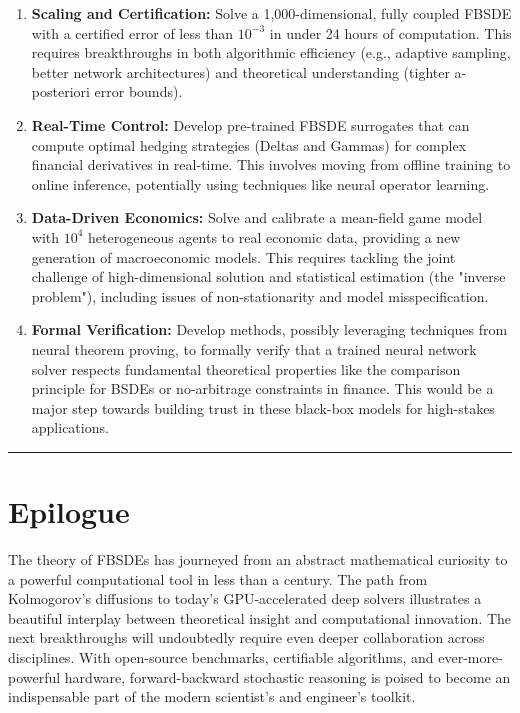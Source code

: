 \documentclass[11pt,letterpaper,oneside]{article}
\theoremstyle{plain}
\theoremstyle{definition}
\theoremstyle{remark}
\begin{document}
\begin{enumerate}[label=\textbf{C\arabic*}. ,leftmargin=1.6em]
  \item \textbf{Scaling and Certification:} Solve a 1,000-dimensional, fully coupled FBSDE with a certified error of less than \(10^{-3}\) in under 24 hours of computation. This requires breakthroughs in both algorithmic efficiency (e.g., adaptive sampling, better network architectures) and theoretical understanding (tighter a-posteriori error bounds).
  \item \textbf{Real-Time Control:} Develop pre-trained FBSDE surrogates that can compute optimal hedging strategies (Deltas and Gammas) for complex financial derivatives in real-time. This involves moving from offline training to online inference, potentially using techniques like neural operator learning.
  \item \textbf{Data-Driven Economics:} Solve and calibrate a mean-field game model with \(10^4\) heterogeneous agents to real economic data, providing a new generation of macroeconomic models. This requires tackling the joint challenge of high-dimensional solution and statistical estimation (the "inverse problem"), including issues of non-stationarity and model misspecification.
  \item \textbf{Formal Verification:} Develop methods, possibly leveraging techniques from neural theorem proving, to formally verify that a trained neural network solver respects fundamental theoretical properties like the comparison principle for BSDEs or no-arbitrage constraints in finance. This would be a major step towards building trust in these black-box models for high-stakes applications.
\end{enumerate}

\bigskip\hrule\bigskip

\section*{Epilogue}

The theory of FBSDEs has journeyed from an abstract mathematical curiosity to a powerful computational tool in less than a century. The path from Kolmogorov’s diffusions to today’s GPU-accelerated deep solvers illustrates a beautiful interplay between theoretical insight and computational innovation. The next breakthroughs will undoubtedly require even deeper collaboration across disciplines. With open-source benchmarks, certifiable algorithms, and ever-more-powerful hardware, forward-backward stochastic reasoning is poised to become an indispensable part of the modern scientist's and engineer's toolkit.
\end{document}

